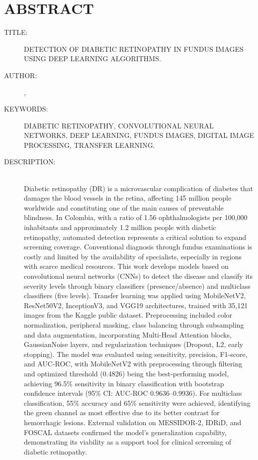 
\chapter*{ABSTRACT}

\footnotesize{
\begin{description}
  \item[TITLE:] \MakeUppercase{Detection of Diabetic Retinopathy in Fundus Images Using Deep Learning Algorithms.}
  \item[AUTHOR:] {\autora}, {\autorb}
  \item[KEYWORDS:] DIABETIC RETINOPATHY, CONVOLUTIONAL NEURAL NETWORKS, DEEP LEARNING, FUNDUS IMAGES, DIGITAL IMAGE PROCESSING, TRANSFER LEARNING.
  \item[DESCRIPTION:]\hfill \\ Diabetic retinopathy (DR) is a microvascular complication of diabetes that damages the blood vessels in the retina, affecting 145 million people worldwide and constituting one of the main causes of preventable blindness. In Colombia, with a ratio of 1.56 ophthalmologists per 100,000 inhabitants and approximately 1.2 million people with diabetic retinopathy, automated detection represents a critical solution to expand screening coverage. Conventional diagnosis through fundus examinations is costly and limited by the availability of specialists, especially in regions with scarce medical resources. This work develops models based on convolutional neural networks (CNNs) to detect the disease and classify its severity levels through binary classifiers (presence/absence) and multiclass classifiers (five levels). Transfer learning was applied using MobileNetV2, ResNet50V2, InceptionV3, and VGG19 architectures, trained with 35,121 images from the Kaggle public dataset. Preprocessing included color normalization, peripheral masking, class balancing through subsampling and data augmentation, incorporating Multi-Head Attention blocks, GaussianNoise layers, and regularization techniques (Dropout, L2, early stopping). The model was evaluated using sensitivity, precision, F1-score, and AUC-ROC, with MobileNetV2 with preprocessing through filtering and optimized threshold (0.4826) being the best-performing model, achieving 96.5\% sensitivity in binary classification with bootstrap confidence intervals (95\% CI: AUC-ROC 0.9636–0.9936). For multiclass classification, 55\% accuracy and 65\% sensitivity were achieved, identifying the green channel as most effective due to its better contrast for hemorrhagic lesions. External validation on MESSIDOR-2, IDRiD, and FOSCAL datasets confirmed the model's generalization capability, demonstrating its viability as a support tool for clinical screening of diabetic retinopathy.

\end{description}}\normalsize
